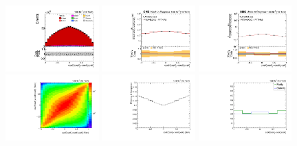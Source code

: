 \begin{refsection}
\clearpage
\begin{figure}[htb]
\begin{center}
 \includegraphics[width=0.32\textwidth]{fig_fullRun2UL/controlplots/combined/Hyp_LLBarCPnr.pdf}
 \includegraphics[width=0.32\textwidth]{fig_fullRun2UL/unfolding/combined/UnfoldedResults_c_Pnr.pdf}
 \includegraphics[width=0.32\textwidth]{fig_fullRun2UL/unfolding/combined/UnfoldedResultsNorm_c_Pnr.pdf} \\
 \includegraphics[width=0.32\textwidth]{fig_fullRun2UL/unfolding/combined/ResponseMatrix_c_Pnr.pdf}
 \includegraphics[width=0.32\textwidth]{fig_fullRun2UL/unfolding/combined/TotEff_c_Pnr.pdf}
 \includegraphics[width=0.32\textwidth]{fig_fullRun2UL/unfolding/combined/PurStab_c_Pnr.pdf} \\

\end{center}
\end{figure}
\end{refsection}
